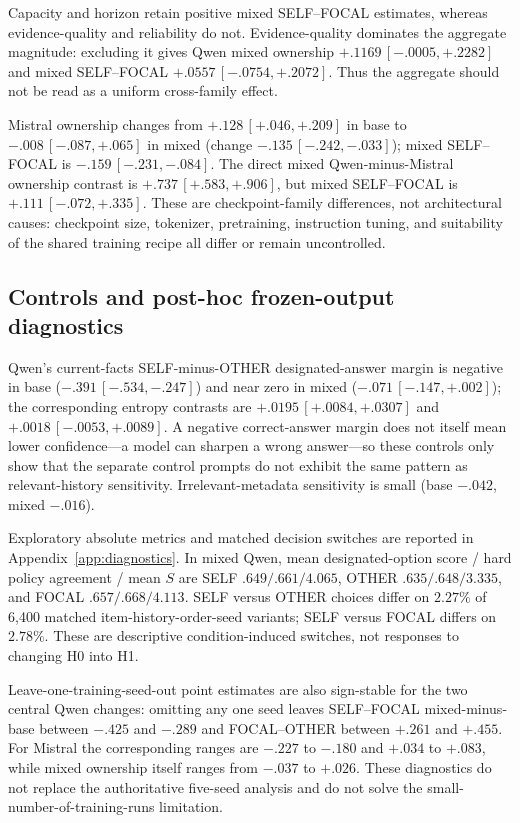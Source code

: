 \documentclass{article}
\begin{document}
Capacity and horizon retain positive mixed SELF--FOCAL estimates, whereas evidence-quality and reliability do not. Evidence-quality dominates the aggregate magnitude: excluding it gives Qwen mixed ownership $+.1169\,[-.0005,+.2282]$ and mixed SELF--FOCAL $+.0557\,[-.0754,+.2072]$. Thus the aggregate should not be read as a uniform cross-family effect.

Mistral ownership changes from $+.128\,[+.046,+.209]$ in base to $-.008\,[-.087,+.065]$ in mixed (change $-.135\,[-.242,-.033]$); mixed SELF--FOCAL is $-.159\,[-.231,-.084]$. The direct mixed Qwen-minus-Mistral ownership contrast is $+.737\,[+.583,+.906]$, but mixed SELF--FOCAL is $+.111\,[-.072,+.335]$. These are checkpoint-family differences, not architectural causes: checkpoint size, tokenizer, pretraining, instruction tuning, and suitability of the shared training recipe all differ or remain uncontrolled.

\subsection{Controls and post-hoc frozen-output diagnostics}

Qwen's current-facts SELF-minus-OTHER designated-answer margin is negative in base ($-.391\,[-.534,-.247]$) and near zero in mixed ($-.071\,[-.147,+.002]$); the corresponding entropy contrasts are $+.0195\,[+.0084,+.0307]$ and $+.0018\,[-.0053,+.0089]$. A negative correct-answer margin does not itself mean lower confidence---a model can sharpen a wrong answer---so these controls only show that the separate control prompts do not exhibit the same pattern as relevant-history sensitivity. Irrelevant-metadata sensitivity is small (base $-.042$, mixed $-.016$).

Exploratory absolute metrics and matched decision switches are reported in Appendix~\ref{app:diagnostics}. In mixed Qwen, mean designated-option score / hard policy agreement / mean $S$ are SELF $.649/.661/4.065$, OTHER $.635/.648/3.335$, and FOCAL $.657/.668/4.113$. SELF versus OTHER choices differ on $2.27\%$ of 6,400 matched item-history-order-seed variants; SELF versus FOCAL differs on $2.78\%$. These are descriptive condition-induced switches, not responses to changing H0 into H1.

Leave-one-training-seed-out point estimates are also sign-stable for the two central Qwen changes: omitting any one seed leaves SELF--FOCAL mixed-minus-base between $-.425$ and $-.289$ and FOCAL--OTHER between $+.261$ and $+.455$. For Mistral the corresponding ranges are $-.227$ to $-.180$ and $+.034$ to $+.083$, while mixed ownership itself ranges from $-.037$ to $+.026$. These diagnostics do not replace the authoritative five-seed analysis and do not solve the small-number-of-training-runs limitation.
\end{document}
